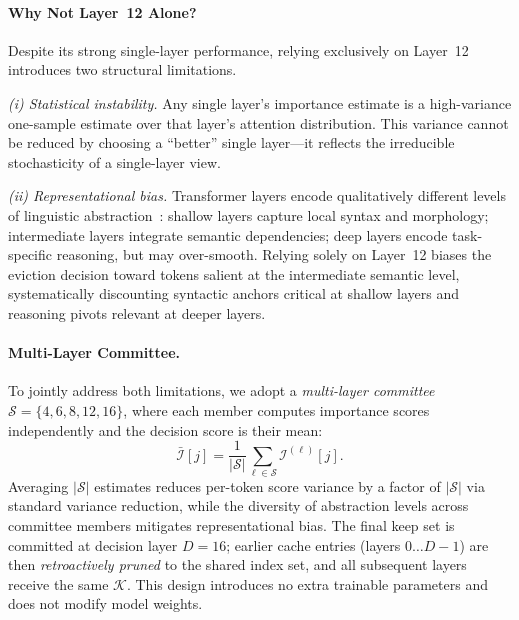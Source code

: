 \documentclass[letterpaper]{article} %
\begin{document}
\paragraph{Why Not Layer~12 Alone?}
Despite its strong single-layer performance, relying exclusively on Layer~12
introduces two structural limitations.

\emph{(i) Statistical instability.} Any single layer's importance estimate is
a high-variance one-sample estimate over that layer's attention distribution.
This variance cannot be reduced by choosing a ``better'' single layer---it
reflects the irreducible stochasticity of a single-layer view.

\emph{(ii) Representational bias.} Transformer layers encode qualitatively
different levels of linguistic abstraction~\cite{tenney-etal-2019-bert,jawahar-etal-2019-bert}:
shallow layers capture local syntax and morphology; intermediate layers
integrate semantic dependencies; deep layers encode task-specific reasoning,
but may over-smooth. Relying solely on Layer~12 biases the eviction decision
toward tokens salient at the intermediate semantic level, systematically
discounting syntactic anchors critical at shallow layers and reasoning pivots
relevant at deeper layers.

\paragraph{Multi-Layer Committee.}
To jointly address both limitations, we adopt a \emph{multi-layer committee}
$\mathcal{S}=\{4,6,8,12,16\}$, where each member computes importance scores
independently and the decision score is their mean:
\begin{equation}
  \bar{\mathcal{I}}[j]
  = \frac{1}{|\mathcal{S}|}\sum_{\ell\in\mathcal{S}} \mathcal{I}^{(\ell)}[j].
\end{equation}
Averaging $|\mathcal{S}|$ estimates reduces per-token score variance by a
factor of $|\mathcal{S}|$ via standard variance reduction, while the
diversity of abstraction levels across committee members mitigates
representational bias. The final keep set is committed at decision layer
$D{=}16$; earlier cache entries (layers $0\ldots D\!-\!1$) are then
\emph{retroactively pruned} to the shared index set, and all subsequent
layers receive the same $\mathcal{K}$. This design introduces no extra
trainable parameters and does not modify model weights.
\end{document}
